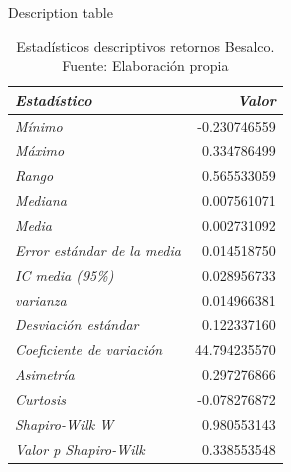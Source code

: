 \documentclass[10pt]{beamer}
\begin{document}
\begin{frame}{Description table}
\begin{table}[ht]
        \centering
        \small %
\begin{tabular}{l r}
\toprule
\textbf{\textit{Estadístico}} & \textbf{\textit{Valor}} \\
\midrule
\textit{Mínimo}             & -0.230746559   \\
\textit{Máximo}             & 0.334786499     \\
\textit{Rango}           & 0.565533059    \\
\textit{Mediana}          & 0.007561071     \\
\textit{Media}            & 0.002731092     \\
\textit{Error estándar de la media}         & 0.014518750 \\
\textit{IC media (95\%)}    & 0.028956733     \\
\textit{varianza}             & 0.014966381     \\
\textit{Desviación estándar}         & 0.122337160     \\
\textit{Coeficiente de variación}        & 44.794235570    \\
\textit{Asimetría}        & 0.297276866     \\
\textit{Curtosis}        & -0.078276872   \\
\textit{Shapiro-Wilk W}      & 0.980553143     \\
\textit{Valor p Shapiro-Wilk}      & 0.338553548     \\
\bottomrule
\end{tabular}
        \caption{Estadísticos descriptivos retornos Besalco. Fuente: Elaboración propia}
    \end{table}
\end{frame}
\end{document}
